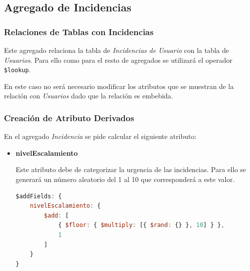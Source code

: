 \documentclass[]{article}
\begin{document}
\subsection{Agregado de Incidencias}
\label{subsec:agregado_incidencias}

\subsubsection{Relaciones de Tablas con Incidencias}
\label{subsubsec:relaciones_incidencias}

Este agregado relaciona la tabla de \textit{Incidencias de Usuario} con la tabla de \textit{Usuarios}. Para ello como para el resto de agregados se utilizará el operador \texttt{\$lookup}.

En este caso no será necesario modificar los atributos que se muestran de la relación con \textit{Usuarios} dado que la relación es embebida.

\subsubsection{Creación de Atributo Derivados}
\label{subsubsec:derivados_incidencias}

En el agregado \textit{Incidencia} se pide calcular el siguiente atributo:
\begin{itemize}
    \item \textbf{nivelEscalamiento}
    
    Este atributo debe de categorizar la urgencia de las incidencias. Para ello se generará un número aleatorio del 1 al 10 que corresponderá a este valor.

    \begin{lstlisting}[language=JavaScript, caption={Cálculo de nivelEscalamiento}]
$addFields: {
    nivelEscalamiento: {
        $add: [
            { $floor: { $multiply: [{ $rand: {} }, 10] } },
            1
        ]
    }
}
    \end{lstlisting}
\end{itemize}
\end{document}
